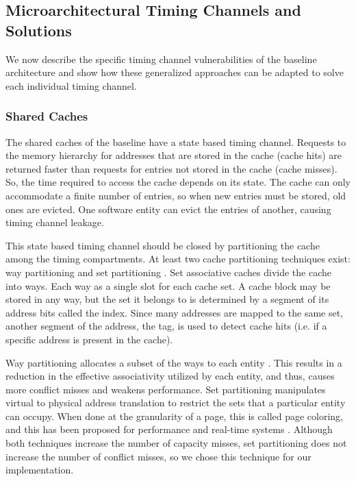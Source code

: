 \subsection{Microarchitectural Timing Channels and Solutions}
We now describe the specific timing channel vulnerabilities of the baseline 
architecture and show how these generalized approaches can be adapted to solve 
each individual timing channel.
\subsubsection{Shared Caches}
The shared caches of the baseline have a state based timing channel. Requests 
to the memory hierarchy for addresses that are stored in the cache (cache hits) 
are returned faster than requests for entries not stored in the cache (cache 
misses). So, the time required to access the cache depends on its state. The 
cache can only accommodate a finite number of entries, so when new entries must 
be stored, old ones are evicted. One software entity can evict the entries of 
another, causing timing channel leakage.

This state based timing channel should be closed by partitioning the cache 
among the timing compartments. At least two cache partitioning techniques exist: 
way partitioning and set partitioning 
\cite{rtas_cache_framework,dynamic_partitioning}. Set associative caches divide 
the cache into ways. Each way as a single slot for each cache set. A cache 
block may be stored in any way, but the set it belongs to is determined by a 
segment of its address bits called the index. Since many addresses are mapped 
to the same set, another segment of the address, the tag, is used to detect 
cache hits (i.e. if a specific address is present in the cache).

Way partitioning allocates a subset of the ways to each entity 
\cite{citation_needed}. This results in a reduction in the effective 
associativity utilized by each entity, and thus, causes more conflict misses 
and weakens performance. Set partitioning manipulates virtual to physical 
address translation to restrict the sets that a particular entity can occupy.  
When done at the granularity of a page, this is called page coloring, and this 
has been proposed for performance \cite{citation_needed} and real-time systems 
\cite{rtas_cache_framework}.  Although both techniques increase the number of 
capacity misses, set partitioning does not increase the number of conflict 
misses, so we chose this technique for our implementation.

